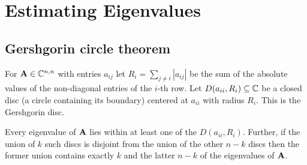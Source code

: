 \section{Estimating Eigenvalues}
\subsection{Gershgorin circle theorem}
For $\mathbf{A}\in\mathbb{C}^{n,n}$ with entries $a_{ij}$ let $R_i=\sum_{j\ne i} |a_{ij}|$ be the sum of the absolute values of the non-diagonal entries of the $i$-th row. Let $D(a_{ii},R_i)\subseteq\mathbb{C}$ be a closed disc (a circle containing its boundary) centered at $a_{ii}$ with radius $R_i$. This is the Gershgorin disc.

Every eigenvalue of $\mathbf{A}$ lies within at least one of the $D(a_{ii},R_i)$. Further, if the union of $k$ such discs is disjoint from the union of the other $n-k$ discs then the former union contains exactly $k$ and the latter $n-k$ of the eigenvalues of $\mathbf{A}$.
